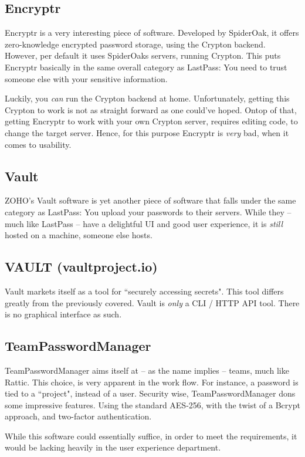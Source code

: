 		\subsection{Encryptr}
			Encryptr is a very interesting piece of software. Developed by SpiderOak, it offers zero-knowledge encrypted password storage, using the Crypton backend. However, per default it uses SpiderOaks servers, running Crypton. This puts Encryptr basically in the same overall category as LastPass: You need to trust someone else with your sensitive information. 

			Luckily, you \emph{can} run the Crypton backend at home. Unfortunately, getting this Crypton to work is not as straight forward as one could've hoped. Ontop of that, getting Encryptr to work with your own Crypton server, requires editing code, to change the target server. Hence, for this purpose Encryptr is \emph{very} bad, when it comes to usability.

		\subsection{Vault}
			ZOHO's Vault software is yet another piece of software that falls under the same category as LastPass: You upload your passwords to their servers. While they -- much like LastPass -- have a delightful UI and good user experience, it is \emph{still} hosted on a machine, someone else hosts.

			
		\subsection{VAULT (vaultproject.io)}
			Vault markets itself as a tool for ``securely accessing secrets". This tool differs greatly from the previously covered. Vault is \emph{only} a CLI / HTTP API tool. There is no graphical interface as such.

		\subsection{TeamPasswordManager}
			TeamPasswordManager aims itself at -- as the name implies -- teams, much like Rattic. This choice, is very apparent in the work flow. For instance, a password is tied to a ``project", instead of a user. Security wise, TeamPasswordManager dons some impressive features. Using the standard AES-256, with the twist of a Bcrypt approach, and two-factor authentication.

			While this software could essentially suffice, in order to meet the requirements, it would be lacking heavily in the user experience department.



